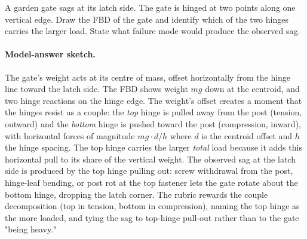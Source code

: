 \begin{exercise}
A garden gate sags at its latch side. The gate is hinged at two
points along one vertical edge. Draw the FBD of the gate and
identify which of the two hinges carries the larger load. State
what failure mode would produce the observed sag.
\paragraph{Model-answer sketch.} The gate's weight acts at its centre of
mass, offset horizontally from the hinge line toward the latch side. The
FBD shows weight $mg$ down at the centroid, and two hinge reactions on
the hinge edge. The weight's offset creates a moment that the hinges
resist as a couple: the \emph{top} hinge is pulled away from the post
(tension, outward) and the \emph{bottom} hinge is pushed toward the post
(compression, inward), with horizontal forces of magnitude $mg \cdot
d/h$ where $d$ is the centroid offset and $h$ the hinge spacing. The top
hinge carries the larger \emph{total} load because it adds this
horizontal pull to its share of the vertical weight. The observed sag at
the latch side is produced by the top hinge pulling out: screw
withdrawal from the post, hinge-leaf bending, or post rot at the top
fastener lets the gate rotate about the bottom hinge, dropping the latch
corner. The rubric rewards the couple decomposition (top in tension,
bottom in compression), naming the top hinge as the more loaded, and
tying the sag to top-hinge pull-out rather than to the gate "being
heavy."
\end{exercise}

